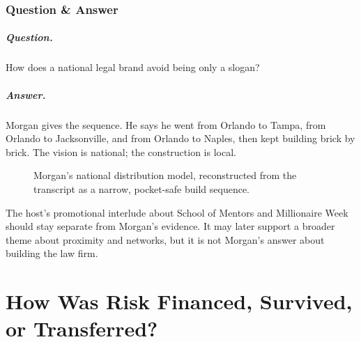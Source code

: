 \documentclass[11pt,oneside]{book}
\begin{document}
\subsection{Question \& Answer}

\paragraph{Question.}
How does a national legal brand avoid being only a slogan?

\paragraph{Answer.}
Morgan gives the sequence. He says he went from Orlando to Tampa, from Orlando to Jacksonville, and from Orlando to Naples, then kept building brick by brick. The vision is national; the construction is local.

\begin{figure}
\centering
{}
\caption{Morgan's national distribution model, reconstructed from the transcript as a narrow, pocket-safe build sequence.}
\end{figure}

The host's promotional interlude about School of Mentors and Millionaire Week should stay separate from Morgan's evidence. It may later support a broader theme about proximity and networks, but it is not Morgan's answer about building the law firm.

\chapter{How Was Risk Financed, Survived, or Transferred?}
\end{document}
